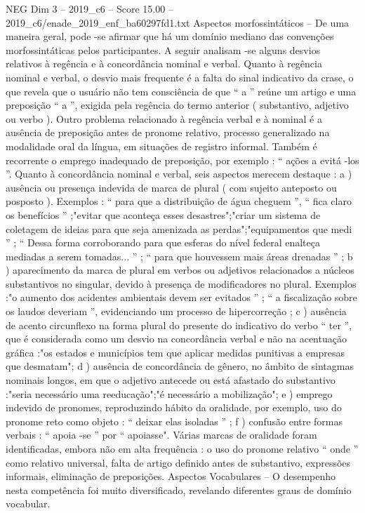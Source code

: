\begin{textsample}{NEG Dim 3 – 2019\_c6 – Score 15.00 – 2019\_c6/enade\_2019\_enf\_ba60297fd1.txt}
Aspectos morfossintáticos – De uma maneira geral, pode -se afirmar que há um domínio mediano das convenções morfossintáticas pelos participantes.
A seguir analisam -se alguns desvios relativos à regência e à concordância nominal e verbal.
Quanto à regência nominal e verbal, o desvio mais frequente é a falta do sinal indicativo da crase, o que revela que o usuário não tem consciência de que “ a ” reúne um artigo e uma preposição “ a ”, exigida pela regência do termo anterior ( substantivo, adjetivo ou verbo ).
Outro problema relacionado à regência verbal e à nominal é a ausência de preposição antes de pronome relativo, processo generalizado na modalidade oral da língua, em situações de registro informal.
Também é recorrente o emprego inadequado de preposição, por exemplo : “ ações a evitá -los ”.
Quanto à concordância nominal e verbal, seis aspectos merecem destaque : a ) ausência ou presença indevida de marca de plural ( com sujeito anteposto ou posposto ).
Exemplos : “ para que a distribuição de água cheguem ”, “ fica claro os benefícios ” ;"evitar que aconteça esses desastres";"criar um sistema de coletagem de ideias para que seja amenizada as perdas";"equipamentos que medi ” ; “ Dessa forma corroborando para que esferas do nível federal enalteça mediadas a serem tomadas... ” ; “ para que houvessem mais áreas drenadas ” ; b ) aparecimento da marca de plural em verbos ou adjetivos relacionados a núcleos substantivos no singular, devido à presença de modificadores no plural.
Exemplos :"o aumento dos acidentes ambientais devem ser evitados ” ; “ a fiscalização sobre os laudos deveriam ”, evidenciando um processo de hipercorreção ; c ) ausência de acento circunflexo na forma plural do presente do indicativo do verbo “ ter ”, que é considerada como um desvio na concordância verbal e não na acentuação gráfica :"os estados e municípios tem que aplicar medidas punitivas a empresas que desmatam"; d ) ausência de concordância de gênero, no âmbito de sintagmas nominais longos, em que o adjetivo antecede ou está afastado do substantivo :"seria necessário uma reeducação";"é necessário a mobilização"; e ) emprego indevido de pronomes, reproduzindo hábito da oralidade, por exemplo, uso do pronome reto como objeto : “ deixar elas isoladas ” ; f ) confusão entre formas verbais : “ apoia -se ” por “ apoiasse".
Várias marcas de oralidade foram identificadas, embora não em alta frequência : o uso do pronome relativo “ onde ” como relativo universal, falta de artigo definido antes de substantivo, expressões informais, eliminação de preposições.
Aspectos Vocabulares – O desempenho nesta competência foi muito diversificado, revelando diferentes graus de domínio vocabular.

\end{textsample}
